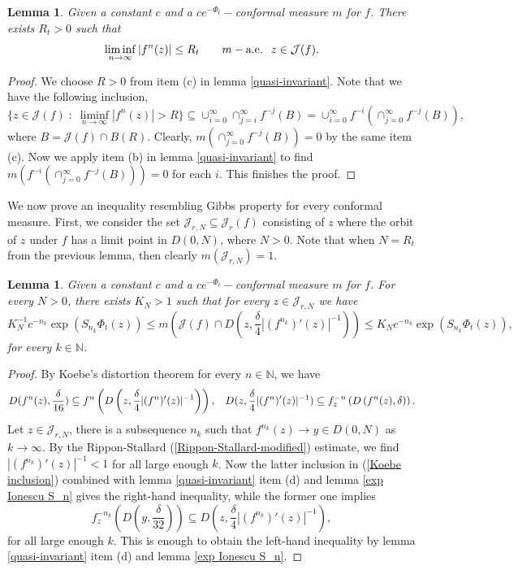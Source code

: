 \documentclass[12pt,reqno]{amsart}
\newtheorem{lemma}[theorem]{Lemma}
\begin{document}
\begin{lemma}\label{limit inf bounded}
    Given a constant $c$ and a $ce^{-\Phi_t}-$conformal measure $m$ for $f$. There exists $R_t>0$ such that 
    $$\liminf_{n \to \infty}|f^n(z)|\leq R_t \hspace{.7cm} m-\text{a.e. \;} z \in \mathcal{J}(f).$$
\end{lemma}
\begin{proof}
    We choose $R>0$ from item (c) in lemma \ref{quasi-invariant}. Note that we have the following inclusion, 
    $$\{z \in \mathcal{J}(f) \; : \; \liminf_{n \to \infty} |f^n(z)| >R\} \subseteq \cup_{i=0}^{\infty} \cap_{j=i}^{\infty}f^{-j}(B)=\cup_{i=0}^{\infty}f^{-i}\left( \cap_{j=0}^{\infty}f^{-j}(B)\right),$$
    where $B=\mathcal{J}(f)\cap B(R)$. Clearly, $m\left( \cap_{j=0}^{\infty}f^{-j}(B)\right)=0$ by the same item (c). Now we apply item (b) in lemma \ref{quasi-invariant} to find  $m\left(f^{-i} \left( \cap_{j=0}^{\infty}f^{-j}(B)\right)\right)=0$ for each $i$. This finishes the proof.
\end{proof}
\noindent We now prove an inequality resembling Gibbs property for every conformal measure. First, we consider the set $\mathcal{J}_{r,N} \subseteq \mathcal{J}_r(f)$ consisting of $z$ where the orbit of $z$ under $f$ has a limit point in $D(0, N)$, where $N>0$. Note that when $N=R_t$ from the previous lemma, then clearly $m(\mathcal{J}_{r,N})=1.$
\begin{lemma}\label{Gibbs}
    Given a constant $c$ and a $ce^{-\Phi_t}-$conformal measure $m$ for $f$. For every $N>0$, there exists $K_N>1$ such that for every $z \in \mathcal{J}_{r,N}$ we have
    $$K_N^{-1}c^{-n_k}\exp(S_{n_k}\Phi_t(z)) \leq m\left(\mathcal{J}(f)\cap D\left(z,\frac{\delta}{4} |(f^{n_k})'(z)|^{-1}\right) \right) \leq K_N c^{-n_k}\exp(S_{n_k}\Phi_t(z)),$$
    for every $k\in\mathbb{N}$.
\end{lemma}
\begin{proof}
    By Koebe's distortion theorem for every $n\in \mathbb{N}$, we have
    \begin{equation}\label{Koebe inclusion}
        D(f^n(z),\frac{\delta}{16}) \subseteq f^n \left(D\left(z,\frac{\delta}{4}|(f^n)'(z)|^{-1}\right) \right), \hspace{.3cm} D(z,\frac{\delta}{4}|(f^n)'(z)|^{-1}) \subseteq f_z^{-n} \left(D\left(f^n(z),\delta \right) \right).
    \end{equation}
    Let $z\in \mathcal{J}_{r,N}$,  there is a subsequence $n_k$ such that $f^{n_k}(z) \to y \in D(0,N)$ as $k \to \infty$. By the Rippon-Stallard (\ref{Rippon-Stallard-modified}) estimate, we find $|(f^{n_k})'(z)|^{-1} < 1$ for all large enough $k$. Now the latter inclusion in (\ref{Koebe inclusion}) combined with lemma \ref{quasi-invariant} item (d) and lemma \ref{exp Ionescu S_n} gives the right-hand inequality, while the former one implies
    $$f_z^{-n_k}\left(D(y,\frac{\delta}{32})\right) \subseteq D\left(z,\frac{\delta}{4}|(f^{n_k})'(z)|^{-1}\right) ,$$
    for all large enough $k$. This is enough to obtain the left-hand inequality by lemma \ref{quasi-invariant} item (d) and lemma \ref{exp Ionescu S_n}.
\end{proof}
\end{document}
